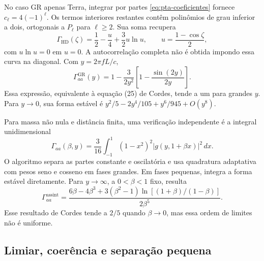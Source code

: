 No caso GR apenas Terra, integrar por partes
\eqref{eq:pta-coeficientes} fornece
\(c_\ell=4(-1)^\ell\). Os termos interiores restantes contêm
polinômios de grau inferior a dois, ortogonais a \(P_\ell\) para
\(\ell\geq2\). Sua soma recupera
\begin{equation}
 \Gamma_{\mathrm{HD}}(\zeta)
 =\frac12-\frac{u}{4}+\frac32u\ln u,
 \qquad u=\frac{1-\cos\zeta}{2},
 \label{eq:pta-hd}
\end{equation}
com \(u\ln u=0\) em \(u=0\). A autocorrelação completa não é
obtida impondo essa curva na diagonal. Com \(y=2\pi fL/c\),
\begin{equation}
 \Gamma_{aa}^{\mathrm{GR}}(y)
 =1-\frac{3}{2y^2}\left[1-\frac{\sin(2y)}{2y}\right].
 \label{eq:pta-auto-gr}
\end{equation}
Essa expressão, equivalente à equação (25) de Cordes, tende a um
para grandes \(y\). Para \(y\to0\), sua forma estável é
\(y^2/5-2y^4/105+y^6/945+O(y^8)\).

Para massa não nula e distância finita, uma verificação independente
é a integral unidimensional
\begin{equation}
 \Gamma_{aa}(\beta,y)
 =\frac3{16}\int_{-1}^{1}(1-x^2)^2
                  |g(y,1+\beta x)|^2\,dx.
 \label{eq:pta-auto-integral}
\end{equation}
O algoritmo separa as partes constante e oscilatória e usa
quadratura adaptativa com pesos seno e cosseno em fases grandes.
Em fases pequenas, integra a forma estável diretamente. Para
\(y\to\infty\), a \(0<\beta<1\) fixo, resulta
\begin{equation}
 \Gamma_{aa}^{\mathrm{assint}}=
 \frac{6\beta-4\beta^3+
  3(\beta^2-1)\ln[(1+\beta)/(1-\beta)]}{2\beta^5}.
 \label{eq:pta-auto-assintotica}
\end{equation}
Esse resultado de Cordes tende a \(2/5\) quando
\(\beta\to0\), mas essa ordem de limites não é uniforme.

\subsection{Limiar, coerência e separação pequena}

